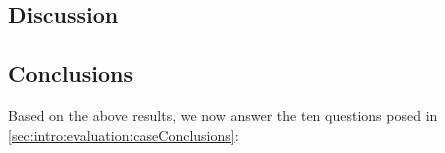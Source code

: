 %



\subsection{Discussion}
\label{sec:\secname:discussion}





\subsection{Conclusions}

Based on the above results, we now answer the ten questions posed in
\autoref{sec:intro:evaluation:caseConclusions}:

